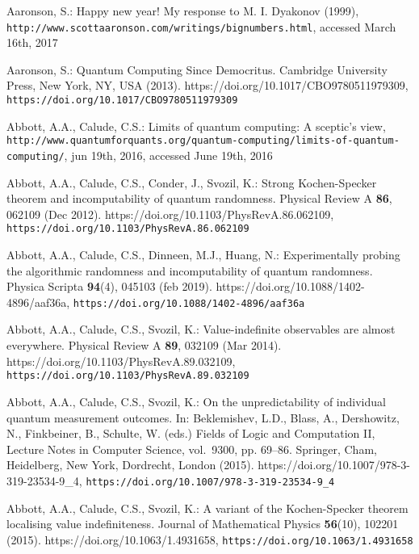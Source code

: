 \documentclass[runningheads]{llncs}
\begin{document}
\begin{thebibliography}{10}
\providecommand{\url}[1]{\texttt{#1}}
\providecommand{\urlprefix}{URL }
\providecommand{\doi}[1]{https://doi.org/#1}

Aaronson, S.: Happy new year! {M}y response to {M}. {I}. {D}yakonov (1999),
  \url{http://www.scottaaronson.com/writings/bignumbers.html}, accessed March
  16th, 2017

Aaronson, S.: Quantum Computing Since {D}emocritus. Cambridge University Press,
  New York, NY, USA (2013). \doi{10.1017/CBO9780511979309},
  \url{https://doi.org/10.1017/CBO9780511979309}

Abbott, A.A., Calude, C.S.: Limits of quantum computing: A sceptic's view,
  \url{http://www.quantumforquants.org/quantum-computing/limits-of-quantum-computing/},
  jun 19th, 2016, accessed June 19th, 2016

Abbott, A.A., Calude, C.S., Conder, J., Svozil, K.: Strong {K}ochen-{S}pecker
  theorem and incomputability of quantum randomness. Physical Review A
  \textbf{86},  062109 (Dec 2012). \doi{10.1103/PhysRevA.86.062109},
  \url{https://doi.org/10.1103/PhysRevA.86.062109}

Abbott, A.A., Calude, C.S., Dinneen, M.J., Huang, N.: Experimentally probing
  the algorithmic randomness and incomputability of quantum randomness. Physica
  Scripta  \textbf{94}(4),  045103 (feb 2019). \doi{10.1088/1402-4896/aaf36a},
  \url{https://doi.org/10.1088/1402-4896/aaf36a}

Abbott, A.A., Calude, C.S., Svozil, K.: Value-indefinite observables are almost
  everywhere. Physical Review A  \textbf{89},  032109 (Mar 2014).
  \doi{10.1103/PhysRevA.89.032109},
  \url{https://doi.org/10.1103/PhysRevA.89.032109}

Abbott, A.A., Calude, C.S., Svozil, K.: On the unpredictability of individual
  quantum measurement outcomes. In: Beklemishev, L.D., Blass, A., Dershowitz,
  N., Finkbeiner, B., Schulte, W. (eds.) Fields of Logic and Computation II,
  Lecture Notes in Computer Science, vol.~9300, pp. 69--86. Springer, Cham,
  Heidelberg, New York, Dordrecht, London (2015).
  \doi{10.1007/978-3-319-23534-9\_4},
  \url{https://doi.org/10.1007/978-3-319-23534-9\_4}

Abbott, A.A., Calude, C.S., Svozil, K.: A variant of the {K}ochen-{S}pecker
  theorem localising value indefiniteness. Journal of Mathematical Physics
  \textbf{56}(10), 102201 (2015). \doi{10.1063/1.4931658},
  \url{https://doi.org/10.1063/1.4931658}


\end{thebibliography}
\end{document}
